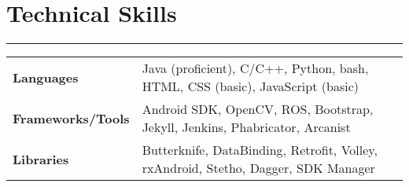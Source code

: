 \documentclass[a4paper]{article}
\begin{document}
\section*{Technical Skills}
\hrule
\vspace{3mm}
\begin{tabular}{@{}m{4.0cm}m{13cm}@{}}
	\textbf{\textrm{Languages}}        & Java (proficient), C/C++, Python, bash, HTML, CSS (basic), JavaScript (basic)      \\ 
	\textbf{\textrm{Frameworks/Tools}} & Android SDK, OpenCV, ROS, Bootstrap, Jekyll, Jenkins, Phabricator, Arcanist        \\
	\textbf{\textrm{Libraries}}        & Butterknife, DataBinding, Retrofit, Volley, rxAndroid, Stetho, Dagger, SDK Manager \\
\end{tabular}

\end{document}

